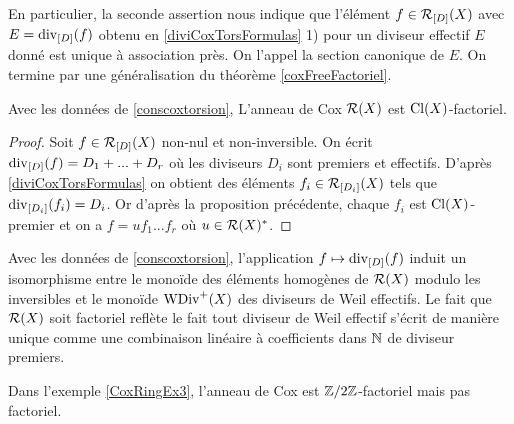 En particulier, la seconde assertion nous indique que l'élément $f\in \mathcal{R}_{[D]}(X)$ avec $E=\operatorname{div}_{[D]}(f)$ obtenu en \ref{diviCoxTorsFormulas} 1) pour un diviseur effectif $E$ donné est unique à association près. On l'appel la section canonique de $E$. On termine par une généralisation du théorème \ref{coxFreeFactoriel}.

\begin{thm}
Avec les données de \ref{conscoxtorsion}, L'anneau de Cox $\mathcal{R}(X)$ est $\operatorname{Cl}(X)$-factoriel.
\end{thm}
\begin{proof}
Soit $f\in\mathcal{R}_{[D]}(X)$ non-nul et non-inversible. On écrit $\operatorname{div}_{[D]}(f)=D_1+...+D_r$ où les diviseurs $D_i$ sont premiers et effectifs. D'après \ref{diviCoxTorsFormulas} on obtient des éléments $f_i\in\mathcal{R}_{[D_i]}(X)$ tels que $\operatorname{div}_{[D_i]}(f_i)=D_i$. Or d'après la proposition précédente, chaque $f_i$ est $\operatorname{Cl}(X)$-premier et on a $f=uf_1...f_r$ où $u\in\mathcal{R}(X)^*$.
\end{proof}

\begin{rem}
Avec les données de \ref{conscoxtorsion}, l'application $f\mapsto \operatorname{div}_{[D]}(f)$ induit un isomorphisme entre le monoïde des éléments homogènes de $\mathcal{R}(X)$ modulo les inversibles et le monoïde $\operatorname{WDiv}^+(X)$ des diviseurs de Weil effectifs. Le fait que $\mathcal{R}(X)$ soit factoriel reflète le fait tout diviseur de Weil effectif s'écrit de manière unique comme une combinaison linéaire à coefficients dans $\mathbb{N}$ de diviseur premiers.
\end{rem}

\begin{ex}
Dans l'exemple \ref{CoxRingEx3}, l'anneau de Cox est $\mathbb{Z}/2\mathbb{Z}$-factoriel mais pas factoriel.
\end{ex}


